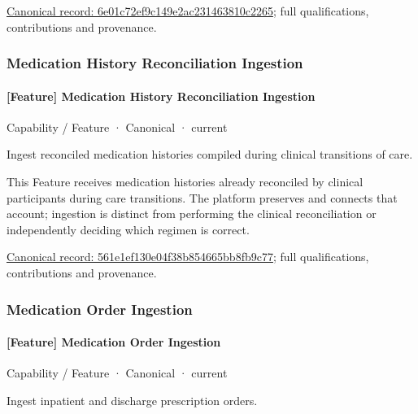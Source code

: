 {\footnotesize \href{../../../../continuum/strategy/capability/feature/6e01c72ef9c149e2ac231463810c2265.md}{Canonical record: 6e01c72ef9c149e2ac231463810c2265}; full qualifications, contributions and provenance.}\par
\subsubsection{Medication History Reconciliation Ingestion}

\paragraph{[Feature] Medication History Reconciliation Ingestion}

\label{element:561e1ef130e04f38b854665bb8fb9c77}
{\small Capability / Feature · Canonical · current}\par

Ingest reconciled medication histories compiled during clinical transitions of care.



This Feature receives medication histories already reconciled by clinical participants during care transitions. The platform preserves and connects that account; ingestion is distinct from performing the clinical reconciliation or independently deciding which regimen is correct.


{\footnotesize \href{../../../../continuum/strategy/capability/feature/561e1ef130e04f38b854665bb8fb9c77.md}{Canonical record: 561e1ef130e04f38b854665bb8fb9c77}; full qualifications, contributions and provenance.}\par
\subsubsection{Medication Order Ingestion}

\paragraph{[Feature] Medication Order Ingestion}

\label{element:5247b47f181243bb975ae2cd70db65ba}
{\small Capability / Feature · Canonical · current}\par

Ingest inpatient and discharge prescription orders.



